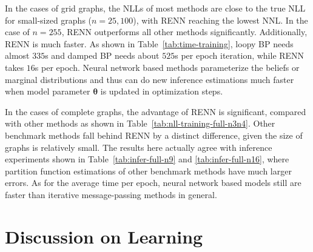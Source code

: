 In the cases of grid graphs, the NLLs of most methods are close to the true NLL for small-sized graphs ($n=25,100$), with RENN reaching the lowest NNL. In the case of $n=255$, RENN outperforms all other methods significantly. Additionally, RENN is much faster. As shown in Table~\ref{tab:time-training}, loopy BP needs almost $335$s and damped BP needs about $525$s per epoch iteration, while RENN takes $16$s per epoch.
Neural network based methods parameterize the beliefs or marginal distributions and thus can do new inference estimations much faster when model parameter $\bm{\theta}$ is updated in optimization steps. %



In the cases of complete graphs, the advantage of RENN is significant, compared with other methods as shown in Table~\ref{tab:nll-training-full-n3n4}. Other benchmark methods fall behind RENN by a distinct difference, given the size of graphs is relatively small. The results here actually agree with inference experiments shown in Table~\ref{tab:infer-full-n9} and \ref{tab:infer-full-n16}, where partition function estimations of other benchmark methods have much larger errors. As for the average time per epoch, neural network based models still are faster than iterative message-passing methods in general.


\section{Discussion on Learning}

